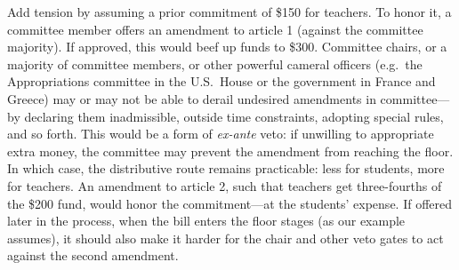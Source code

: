 \documentclass[letter,12pt]{article}
\begin{document}
Add tension by assuming a prior commitment of \$150 for teachers. To honor it, a committee member offers an amendment to article 1 (against the committee majority). If approved, this would beef up funds to \$300. Committee chairs, or a majority of committee members, or other powerful cameral officers (e.g.\ the Appropriations committee in the U.S.\ House or the government in France and Greece) may or may not be able to derail undesired amendments in committee---by declaring them inadmissible, outside time constraints, adopting special rules, and so forth. This would be a form of \emph{ex-ante} veto: if unwilling to appropriate extra money, the committee may prevent the amendment from reaching the floor. In which case, the distributive route remains practicable: less for students, more for teachers. An amendment to article 2, such that teachers get three-fourths of the \$200 fund, would honor the commitment---at the students' expense. If offered later in the process, when the bill enters the floor stages (as our example assumes), it should also make it harder for the chair and other veto gates to act against the second amendment. 
\end{document}
